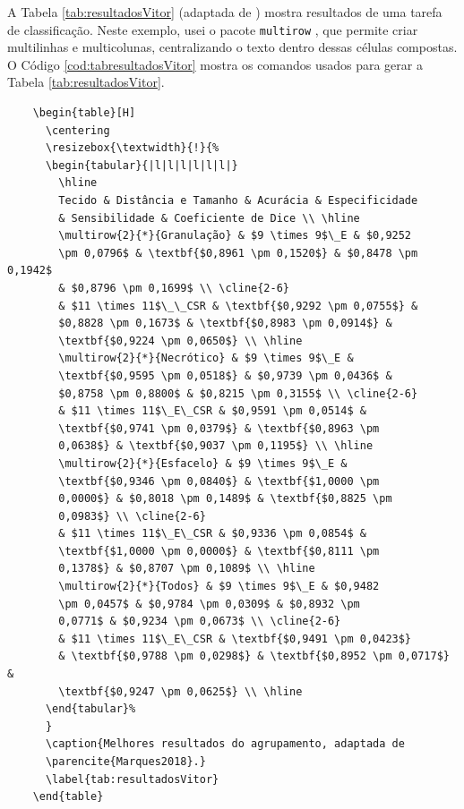 A Tabela \ref{tab:resultadosVitor} (adaptada de \parencite{Marques2018}) mostra resultados de uma tarefa de classificação. Neste exemplo, usei o pacote \texttt{multirow} \parencite{multirow}, que permite criar multilinhas e multicolunas, centralizando o texto dentro dessas células compostas. O Código \ref{cod:tabresultadosVitor} mostra os comandos usados para gerar a Tabela \ref{tab:resultadosVitor}.

\begin{listing}[H]
	\begin{verbatim}
	\begin{table}[H]
	  \centering
	  \resizebox{\textwidth}{!}{%
	  \begin{tabular}{|l|l|l|l|l|l|}
	    \hline
	    Tecido & Distância e Tamanho & Acurácia & Especificidade  
	    & Sensibilidade & Coeficiente de Dice \\ \hline
	    \multirow{2}{*}{Granulação} & $9 \times 9$\_E & $0,9252 
	    \pm 0,0796$ & \textbf{$0,8961 \pm 0,1520$} & $0,8478 \pm 0,1942$ 
	    & $0,8796 \pm 0,1699$ \\ \cline{2-6}
	    & $11 \times 11$\_\_CSR & \textbf{$0,9292 \pm 0,0755$} & 
	    $0,8828 \pm 0,1673$ & \textbf{$0,8983 \pm 0,0914$} & 
	    \textbf{$0,9224 \pm 0,0650$} \\ \hline
	    \multirow{2}{*}{Necrótico} & $9 \times 9$\_E & 
	    \textbf{$0,9595 \pm 0,0518$} & $0,9739 \pm 0,0436$ &
	    $0,8758 \pm 0,8800$ & $0,8215 \pm 0,3155$ \\ \cline{2-6}
	    & $11 \times 11$\_E\_CSR & $0,9591 \pm 0,0514$ & 
	    \textbf{$0,9741 \pm 0,0379$} & \textbf{$0,8963 \pm
	    0,0638$} & \textbf{$0,9037 \pm 0,1195$} \\ \hline
	    \multirow{2}{*}{Esfacelo} & $9 \times 9$\_E & 
	    \textbf{$0,9346 \pm 0,0840$} & \textbf{$1,0000 \pm
	    0,0000$} & $0,8018 \pm 0,1489$ & \textbf{$0,8825 \pm
	    0,0983$} \\ \cline{2-6}
	    & $11 \times 11$\_E\_CSR & $0,9336 \pm 0,0854$ & 
	    \textbf{$1,0000 \pm 0,0000$} & \textbf{$0,8111 \pm
	    0,1378$} & $0,8707 \pm 0,1089$ \\ \hline
	    \multirow{2}{*}{Todos} & $9 \times 9$\_E & $0,9482 
	    \pm 0,0457$ & $0,9784 \pm 0,0309$ & $0,8932 \pm 
	    0,0771$ & $0,9234 \pm 0,0673$ \\ \cline{2-6}
	    & $11 \times 11$\_E\_CSR & \textbf{$0,9491 \pm 0,0423$} 
	    & \textbf{$0,9788 \pm 0,0298$} & \textbf{$0,8952 \pm 0,0717$} & 
	    \textbf{$0,9247 \pm 0,0625$} \\ \hline
	  \end{tabular}%
	  }
	  \caption{Melhores resultados do agrupamento, adaptada de 
	  \parencite{Marques2018}.}
	  \label{tab:resultadosVitor}
	\end{table}
	\end{verbatim}
	\caption{Código usado para gerar a Tabela \ref{tab:resultadosVitor}.}
	\label{cod:tabresultadosVitor}
\end{listing}

